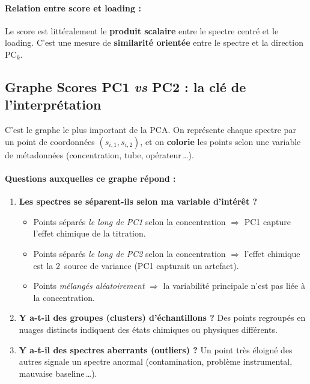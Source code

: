\documentclass[12pt, a4paper]{article}
\begin{document}
\paragraph{Relation entre score et loading :}
Le score est littéralement le \textbf{produit scalaire} entre le spectre
centré et le loading. C'est une mesure de \textbf{similarité orientée} entre
le spectre et la direction PC$_k$.

\subsection{Graphe Scores PC1 \textit{vs} PC2 : la clé de l'interprétation}

C'est le graphe le plus important de la PCA. On représente chaque spectre
par un point de coordonnées $(s_{i,1}, s_{i,2})$, et on \textbf{colorie} les
points selon une variable de métadonnées (concentration, tube, opérateur\,\ldots).

\paragraph{Questions auxquelles ce graphe répond :}

\begin{enumerate}
  \item \textbf{Les spectres se séparent-ils selon ma variable d'intérêt ?}

    \begin{itemize}
      \item Points séparés \emph{le long de PC1} selon la concentration
            $\Rightarrow$ PC1 capture l'effet chimique de la titration.
      \item Points séparés \emph{le long de PC2} selon la concentration
            $\Rightarrow$ l'effet chimique est la 2\ieme\ source de variance
            (PC1 capturait un artefact).
      \item Points \emph{mélangés aléatoirement} $\Rightarrow$ la variabilité
            principale n'est pas liée à la concentration.
    \end{itemize}

  \item \textbf{Y a-t-il des groupes (clusters) d'échantillons ?}
    Des points regroupés en nuages distincts indiquent des états chimiques
    ou physiques différents.

  \item \textbf{Y a-t-il des spectres aberrants (outliers) ?}
    Un point très éloigné des autres signale un spectre anormal
    (contamination, problème instrumental, mauvaise baseline\,\ldots).
\end{enumerate}
\end{document}
